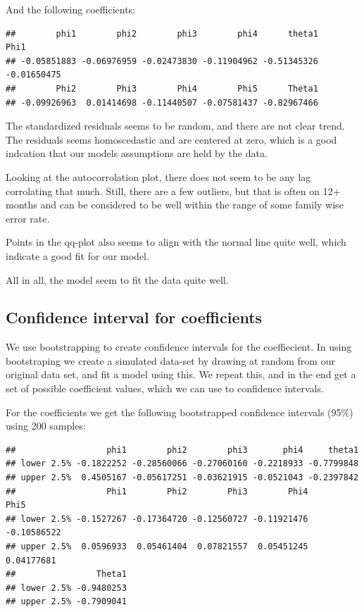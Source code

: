\documentclass[]{article}
\begin{document}
And the following coefficients:

\begin{verbatim}
##        phi1        phi2        phi3        phi4      theta1        Phi1 
## -0.05851883 -0.06976959 -0.02473830 -0.11904962 -0.51345326 -0.01650475 
##        Phi2        Phi3        Phi4        Phi5      Theta1 
## -0.09926963  0.01414698 -0.11440507 -0.07581437 -0.82967466
\end{verbatim}

The standardized residuals seems to be random, and there are not clear
trend. The residuals seems homoscedastic and are centered at zero, which
is a good indcation that our models assumptions are held by the data.

Looking at the autocorrolation plot, there does not seem to be any lag
corrolating that much. Still, there are a few outliers, but that is
often on 12+ months and can be considered to be well within the range of
some family wise error rate.

Points in the qq-plot also seems to align with the normal line quite
well, which indicate a good fit for our model.

All in all, the model seem to fit the data quite well.

\hypertarget{confidence-interval-for-coefficients}{%
\subsection{Confidence interval for
coefficients}\label{confidence-interval-for-coefficients}}

We use bootstrapping to create confidence intervals for the
coeffiecient. In using bootstraping we create a simulated data-set by
drawing at random from our original data set, and fit a model using
this. We repeat this, and in the end get a set of possible coefficient
values, which we can use to confidence intervals.

For the coefficients we get the following bootstrapped confidence
intervals (95\%) using 200 samples:

\begin{verbatim}
##                  phi1        phi2        phi3       phi4     theta1
## lower 2.5% -0.1822252 -0.28560066 -0.27060160 -0.2218933 -0.7799848
## upper 2.5%  0.4505167 -0.05617251 -0.03621915 -0.0521043 -0.2397842
##                  Phi1        Phi2        Phi3        Phi4        Phi5
## lower 2.5% -0.1527267 -0.17364720 -0.12560727 -0.11921476 -0.10586522
## upper 2.5%  0.0596933  0.05461404  0.07821557  0.05451245  0.04177681
##                Theta1
## lower 2.5% -0.9480253
## upper 2.5% -0.7909041
\end{verbatim}
\end{document}
